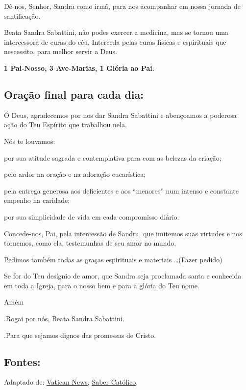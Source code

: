 \documentclass[a4paper,14pt]{extarticle} \usepackage[utf8]{inputenc}
\makeatletter
\newcommand{\vers@resp@sym}{%
  \raisebox{0.2ex}{\rotatebox[origin=c]{-20}{$\m@th\rceil$}}%
}
\newcommand{\vers@resp}[2]{%
  {\ooalign{%
     \hidewidth\kern#1\vers@resp@sym\hidewidth\cr
     #2\cr
  }}%
}
\DeclareRobustCommand{\versicle}{\vers@resp{-0.1em}{V}}
\DeclareRobustCommand{\response}{\vers@resp{0pt}{R}}
\makeatother
\begin{document}
Dê-nos, Senhor, Sandra como irmã, para nos acompanhar em nossa jornada de santificação.


Beata Sandra Sabattini, não podes exercer a medicina, mas se tornou uma intercessora de curas do céu. Interceda pelas curas físicas e espirituais que nescessito, para melhor servir a Deus.


\textbf{1 Pai-Nosso, 3 Ave-Marias,  1 Glória ao Pai.}



\newpage
\subsection{Oração final para cada dia:}


Ó Deus, agradecemos por nos dar Sandra Sabattini e abençoamos a poderosa ação do Teu Espírito que trabalhou nela.

Nós te louvamos:

por sua atitude sagrada e contemplativa para com as belezas da criação;

pelo ardor na oração e na adoração eucarística;

pela entrega generosa aos deficientes e aos “menores” num intenso e constante empenho na caridade;

por sua simplicidade de vida em cada compromisso diário.

Concede-nos, Pai, pela intercessão de Sandra, que imitemos suas virtudes e nos tornemos, como ela, testemunhas de seu amor no mundo.

Pedimos também todas as graças espirituais e materiais …(Fazer pedido)

Se for do Teu desígnio de amor, que Sandra seja proclamada santa e conhecida em toda a Igreja, para o nosso bem e para a glória do Teu nome.

Amém


\response.\quad Rogai por nós, Beata Sandra Sabattini.

\versicle.\quad Para que sejamos dignos das promessas de Cristo.

\vfill

\begin{center}
\subsection*{Fontes:}
Adaptado de: \underline{\href{https://www.vaticannews.va/pt/vaticano/news/2021-10/beatificacao-jovem-sandra-sabattini-rimini.html}{Vatican News}}, \underline{\href{https://www.sabercatolico.com/2021/10/novena-de-sandra-sabattini.html}{Saber Católico}}.
\end{center}
\end{document}
